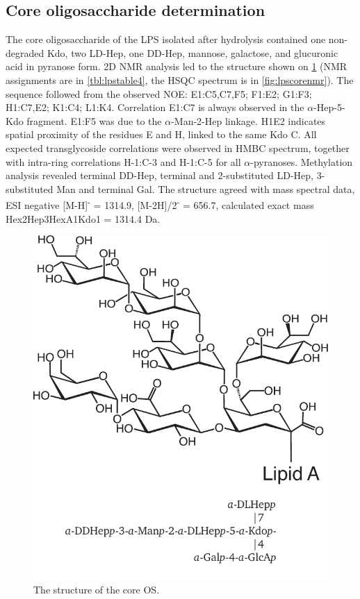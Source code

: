 	\subsection{Core oligosaccharide determination} %
	\label{sub:core_oligosaccharide_determination}

		The core oligosaccharide of the \caulobacter{} \ac{LPS} isolated after  hydrolysis contained one non-degraded Kdo, two LD-Hep, one DD-Hep, mannose, galactose, and glucuronic acid in pyranose form. 2D \ac{NMR} analysis led to the structure shown on \cref{fig:lpscore} (\ac{NMR} assignments are in \cref{tbl:lpstable4}, the \ac{HSQC} spectrum is in \cref{fig:lpscorenmr}). The sequence followed from the observed \ac{NOE}: E1:C5,C7,F5; F1:E2; G1:F3; H1:C7,E2; K1:C4; L1:K4. Correlation E1:C7 is always observed in the $\alpha$-Hep-5-Kdo fragment. E1:F5 was due to the $\alpha$-Man-2-Hep linkage. H1E2 indicates spatial proximity of the residues E and H, linked to the same Kdo C. All expected transglycoside correlations were observed in \ac{HMBC} spectrum, together with intra-ring correlations H-1:C-3 and H-1:C-5 for all $\alpha$-pyranoses. Methylation analysis revealed terminal DD-Hep, terminal and 2-substituted LD-Hep, 3-substituted Man and terminal Gal. The structure agreed with mass spectral data, \ac{ESI} negative [M-H]\textsuperscript{-} = 1314.9, [M-2H]/2\textsuperscript{-} = 656.7, calculated exact mass Hex2Hep3HexA1Kdo1 = 1314.4 Da. 

		\begin{figure}[htb]
			\begin{center}
				\includegraphics[]{lps_chapter/img/lpscore.pdf}
			\end{center}
			\caption{The structure of the \caulobacter core \ac{OS}.}
			\label{fig:lpscore}
		\end{figure}

